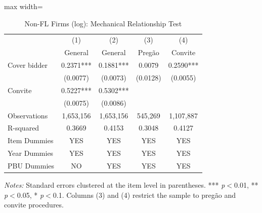 \begin{table}[htbp]
\centering
\caption{Non-FL Firms (log): Mechanical Relationship Test}
\label{tab:nfirms_excl}
\begin{adjustbox}{max width=\textwidth}
\begin{threeparttable}
\small
\begin{tabular}{lcccc}
\toprule
 & (1) & (2) & (3) & (4) \\
 & General & General & Preg\~{a}o & Convite \\
\midrule
Cover bidder & 0.2371*** & 0.1881*** & 0.0079 & 0.2590*** \\
 & (0.0077) & (0.0073) & (0.0128) & (0.0055) \\
Convite & 0.5227*** & 0.5302*** &  &  \\
 & (0.0075) & (0.0086) &  &  \\
\midrule
Observations & 1,653,156 & 1,653,156 & 545,269 & 1,107,887 \\
R-squared & 0.3669 & 0.4153 & 0.3048 & 0.4127 \\
Item Dummies & YES & YES & YES & YES \\
Year Dummies & YES & YES & YES & YES \\
PBU Dummies & NO & YES & YES & YES \\
\bottomrule
\end{tabular}
\begin{tablenotes}
\small
\item \textit{Notes:} Standard errors clustered at the item level in parentheses. *** \textit{p}$<$0.01, ** \textit{p}$<$0.05, * \textit{p}$<$0.1. Columns (3) and (4) restrict the sample to preg\~{a}o and convite procedures.
\end{tablenotes}
\end{threeparttable}
\end{adjustbox}
\end{table}
